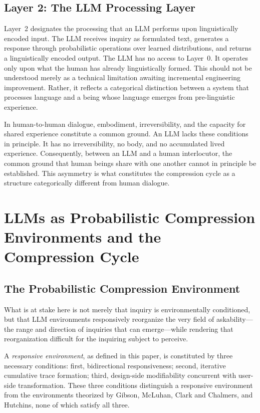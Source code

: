 \documentclass[12pt]{article}
\begin{document}
\subsection{Layer 2: The LLM Processing Layer}

Layer~2 designates the processing that an LLM performs upon linguistically encoded input. The LLM receives inquiry as formulated text, generates a response through probabilistic operations over learned distributions, and returns a linguistically encoded output. The LLM has no access to Layer~0. It operates only upon what the human has already linguistically formed. This should not be understood merely as a technical limitation awaiting incremental engineering improvement. Rather, it reflects a categorical distinction between a system that processes language and a being whose language emerges from pre-linguistic experience.

In human-to-human dialogue, embodiment, irreversibility, and the capacity for shared experience constitute a common ground. An LLM lacks these conditions in principle. It has no irreversibility, no body, and no accumulated lived experience. Consequently, between an LLM and a human interlocutor, the common ground that human beings share with one another cannot in principle be established. This asymmetry is what constitutes the compression cycle as a structure categorically different from human dialogue.

\section{LLMs as Probabilistic Compression Environments and the Compression Cycle}

\subsection{The Probabilistic Compression Environment}

What is at stake here is not merely that inquiry is environmentally conditioned, but that LLM environments responsively reorganize the very field of askability---the range and direction of inquiries that can emerge---while rendering that reorganization difficult for the inquiring subject to perceive.

A \emph{responsive environment}, as defined in this paper, is constituted by three necessary conditions: first, bidirectional responsiveness; second, iterative cumulative trace formation; third, design-side modifiability concurrent with user-side transformation. These three conditions distinguish a responsive environment from the environments theorized by Gibson, McLuhan, Clark and Chalmers, and Hutchins, none of which satisfy all three.
\end{document}
